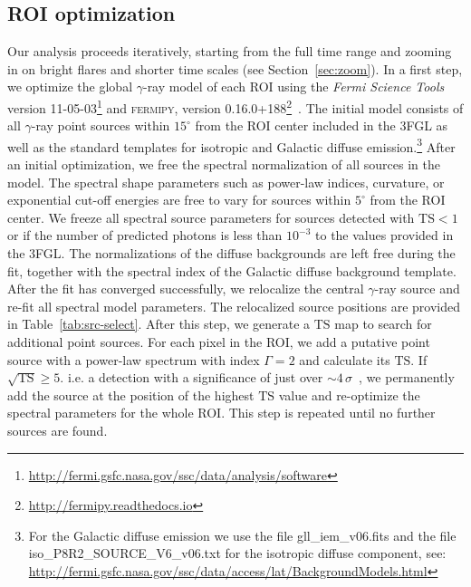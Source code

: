 \documentclass[twocolumn,linenumbers]{aastex62}
\newcommand{\gray}{$\gamma$-ray\xspace}
\begin{document}
\subsection{ROI optimization}
\label{sec:roi}

Our analysis proceeds iteratively, starting from the full time range and zooming in on bright flares and shorter time scales (see Section~\ref{sec:zoom}).
In a first step, we optimize the global \gray model of each ROI using the \textit{Fermi Science Tools} version 11-05-03\footnote{\url{http://fermi.gsfc.nasa.gov/ssc/data/analysis/software}} and \textsc{fermipy}, version 0.16.0+188\footnote{\url{http://fermipy.readthedocs.io}}~\citep{fermipy}.
The initial model consists of all \gray point sources within $15^\circ$ from the ROI center included in the 3FGL as well as the standard templates for isotropic and Galactic diffuse emission.\footnote{For the Galactic diffuse emission we use the file gll\_iem\_v06.fits and the file iso\_P8R2\_SOURCE\_V6\_v06.txt for the isotropic diffuse component, see: \url{ http://fermi.gsfc.nasa.gov/ssc/data/access/lat/BackgroundModels.html}}
After an initial optimization, we free the spectral normalization of all sources in the model. 
The spectral shape parameters such as power-law indices, curvature, or exponential cut-off energies are free to vary for sources within $5^\circ$ from the ROI center. 
We freeze all spectral source parameters for sources detected with $\mathrm{TS} < 1$ or if the number of predicted photons is less than $10^{-3}$ to the values provided in the 3FGL. 
The normalizations of the diffuse backgrounds are left free during the fit, together with the spectral index of the Galactic diffuse background template.
After the fit has converged successfully, 
we relocalize the central \gray source and re-fit all spectral model parameters. The relocalized source positions are provided in Table~\ref{tab:src-select}.
After this step, we generate a $\mathrm{TS}$ map to search for additional point sources. For each pixel in the ROI, we add a putative point source with a power-law spectrum with index $\Gamma = 2$ and calculate its $\mathrm{TS}$. If  $\sqrt{\mathrm{TS}} \geqslant 5$. i.e.  a detection with a significance of just over $\sim 4\,\sigma$~\citep{3fgl}, we permanently add the source at the position of the highest $\mathrm{TS}$ value and re-optimize the spectral parameters for the whole ROI. This step is repeated until no further sources are found.
\end{document}
